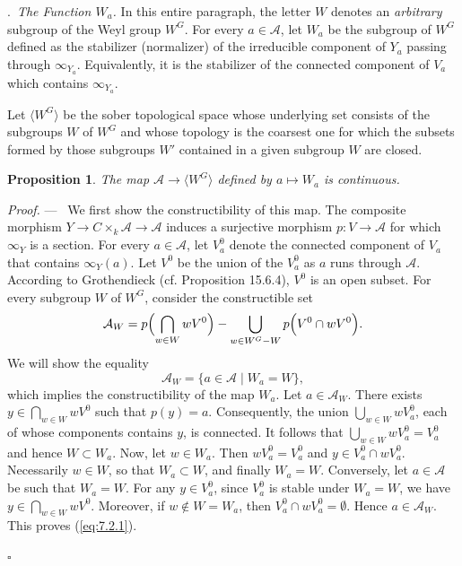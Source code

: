 \documentclass[12pt,a4paper,oneside,english,leqno]{smfart}
\makeatletter
\numberwithin{equation}{subsection}
\newcounter{theo}
\numberwithin{theo}{subsection}
\newenvironment{paragr}[1][]{\medskip\refstepcounter{subsection}%
  \par\noindent\hspace*{\parindent}\thesubsection.\ \emph{#1}%
  \@ifundefined{@empty}{}{}\ignorespaces}{\medskip}
\theoremstyle{plain}
\newtheorem{proposition}[theo]{Proposition}
\theoremstyle{definition}
\theoremstyle{remark}
\newenvironment{preuve}[1][]{\medskip\noindent\textit{Proof.} #1 ---\ }%
  {\hfill\ensuremath{\square}\medskip}
\newcommand{\Ac}{\mathcal{A}}
\newcommand{\bg}{\langle}
\newcommand{\bd}{\rangle}
\makeatother
\begin{document}
\begin{paragr}[The Function $W_a$.]\label{S:7.2}  In this entire paragraph, the letter $W$ denotes an \emph{arbitrary} subgroup of the Weyl group $W^G$. For every $a\in \Ac$, let $W_a$ be the subgroup of $W^G$ defined as the stabilizer (normalizer) of the irreducible component of $Y_a$ passing through $\infty_{Y_a}$. Equivalently, it is the stabilizer of the connected component of $V_a$ which contains $\infty_{Y_a}$.

Let $\bg W^G \bd$ be the sober topological space whose underlying set consists of the subgroups $W$ of $W^G$ and whose topology is the coarsest one for which the subsets formed by those subgroups $W'$ contained in a given subgroup $W$ are closed.

\begin{proposition}\label{thm:7.2.1}
The map $\Ac \to \bg W^G \bd$ defined by $a\mapsto W_a$ is continuous.
\end{proposition}

\begin{preuve}
We first show the constructibility of this map. The composite morphism $Y\to C\times_k \Ac \to \Ac$ induces a surjective morphism $p : V \to \Ac$ for which $\infty_Y$ is a section. For every $a\in \Ac$, let $V_a^0$ denote the connected component of $V_a$ that contains $\infty_Y(a)$. Let $V^0$ be the union of the $V_a^0$ as $a$ runs through $\Ac$. According to Grothendieck (cf. \cite{EGAIV3} Proposition 15.6.4), $V^0$ is an open subset. For every subgroup $W$ of $W^G$, consider the constructible set
$$\Ac_W= p\Bigl( \bigcap_{w\in W} wV^0\Bigr) - \bigcup_{w\in W^G-W} p\Bigl( V^0\cap  wV^0\Bigr).$$
We will show the equality
\begin{equation}\label{eq:7.2.1}
  \Ac_W=\{a\in \Ac \mid W_a=W \},
\end{equation}
which implies the constructibility of the map $W_a$. Let $a\in \Ac_W$. There exists $y\in \bigcap_{w\in W} wV^0$ such that $p(y)=a$. Consequently, the union $\bigcup_{w\in W} wV^0_a$, each of whose components contains $y$, is connected. It follows that $\bigcup_{w\in W} wV^0_a=V^0_a$ and hence $W\subset W_a$. Now, let $w\in W_a$. Then $wV_a^0=V_a^0$ and $y\in V^0_a\cap  wV^0_a$. Necessarily $w\in W$, so that $W_a\subset W$, and finally $W_a=W$. Conversely, let $a\in \Ac$ be such that $W_a=W$. For any $y\in V_a^0$, since $V_a^0$ is stable under $W_a=W$, we have $y\in \bigcap_{w\in W} wV^0$. Moreover, if $w\notin W=W_a$, then $V^0_a\cap  wV^0_a=\emptyset$. Hence $a\in \Ac_W$. This proves (\ref{eq:7.2.1}).


\end{preuve}
\end{paragr}
\end{document}
